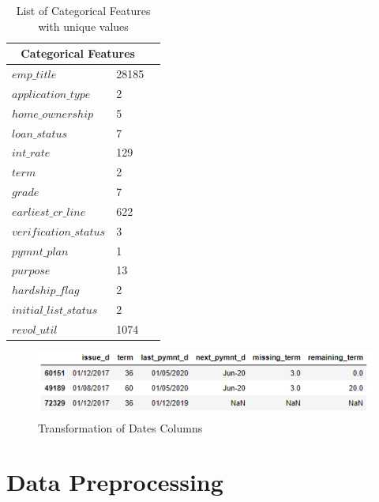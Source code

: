 \documentclass[12pt]{article}
\begin{document}
\begin{table}[h!]
	\centering
	\begin{tabular}{ |p{4cm}|p{3cm}|p{3cm}|  }
		\hline
		\multicolumn{2}{|c|}{Categorical Features} \\

		\hline
		$emp\_title$ & 28185 \\
		$application\_type$ & 2 \\
		$home\_ownership$ & 5 \\
		$loan\_status$ & 7 \\
		$int\_rate$ & 129 \\
		$term$ & 2 \\
		$grade$ & 7 \\
		$earliest\_cr\_line$ & 622 \\
		$verification\_status$ & 3 \\
		$pymnt\_plan$ & 1 \\
		$purpose$ & 13 \\
		$hardship\_flag$ & 2\\
		$initial\_list\_status$ & 2\\
		$revol\_util$ & 1074 \\
		\hline
	\end{tabular}
	\caption{List of Categorical Features with unique values}
	\label{table:1}
\end{table}


\begin{figure}[h!]
	\centering
	\includegraphics{dates.png}
	\caption{Transformation of Dates Columns}
	\label{fig:dates}
\end{figure}


\section{Data Preprocessing}
\end{document}
